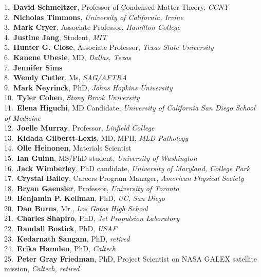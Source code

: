 1.~{\bf David Schmeltzer}, Professor of Condensed Matter Theory, {\sl CCNY} \\
2.~{\bf Nicholas Timmons}, {\sl University of California, Irvine} \\
3.~{\bf Mark Cryer}, Associate Professor, {\sl Hamilton College} \\
4.~{\bf Justine Jang}, Student, {\sl MIT} \\
5.~{\bf Hunter G. Close}, Associate Professor, {\sl Texas State University} \\
6.~{\bf Kanene Ubesie}, MD, {\sl Dallas, Texas} \\
7.~{\bf Jennifer Sims} \\
8.~{\bf Wendy Cutler}, Ms, {\sl SAG/AFTRA} \\
9.~{\bf Mark Neyrinck}, PhD, {\sl Johns Hopkins University} \\
10.~{\bf Tyler Cohen}, {\sl Stony Brook University} \\
11.~{\bf Elena Higuchi}, MD Candidate, {\sl University of California San Diego School of Medicine} \\
12.~{\bf Joelle Murray}, Professor, {\sl Linfield College} \\
13.~{\bf Kidada Gilbertt-Lexis}, MD, MPH, {\sl MLD Pathology} \\
14.~{\bf Olle Heinonen}, Materials Scientist \\
15.~{\bf Ian Guinn}, MS/PhD student, {\sl University of Washington} \\
16.~{\bf Jack Wimberley}, PhD candidate, {\sl University of Maryland, College Park} \\
17.~{\bf Crystal Bailey}, Careers Program Manager, {\sl American Physical Society} \\
18.~{\bf Bryan Gaensler}, Professor, {\sl University of Toronto} \\
19.~{\bf Benjamin P. Kellman}, PhD, {\sl UC, San Diego} \\
20.~{\bf Dan Burns}, Mr., {\sl Los Gatos High School} \\
21.~{\bf Charles Shapiro}, PhD, {\sl Jet Propulsion Laboratory} \\
22.~{\bf Randall Bostick}, PhD, {\sl USAF} \\
23.~{\bf Kedarnath Sangam}, PhD, {\sl retired} \\
24.~{\bf Erika Hamden}, PhD, {\sl Caltech} \\
25.~{\bf Peter Gray Friedman}, PhD, Project Scientist on NASA GALEX satellite mission, {\sl Caltech, retired} \\
